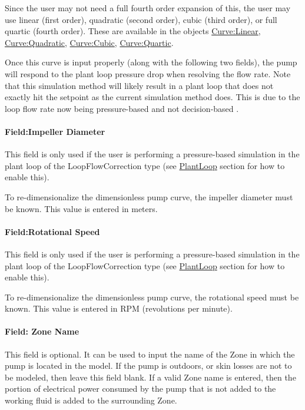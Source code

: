 Since the user may not need a full fourth order expansion of this, the user may use linear (first order), quadratic (second order), cubic (third order), or full quartic (fourth order). These are available in the objects \hyperref[curvelinear]{Curve:Linear}, \hyperref[curvequadratic]{Curve:Quadratic}, \hyperref[curvecubic]{Curve:Cubic}, \hyperref[curvequartic]{Curve:Quartic}.

Once this curve is input properly (along with the following two fields), the pump will respond to the plant loop pressure drop when resolving the flow rate. Note that this simulation method will likely result in a plant loop that does not exactly hit the setpoint as the current simulation method does. This is due to the loop flow rate now being pressure-based and not decision-based .

\paragraph{Field:Impeller Diameter}\label{fieldimpeller-diameter}

This field is only used if the user is performing a pressure-based simulation in the plant loop of the LoopFlowCorrection type (see \hyperref[plantloop]{PlantLoop} section for how to enable this).

To re-dimensionalize the dimensionless pump curve, the impeller diameter must be known. This value is entered in meters.

\paragraph{Field:Rotational Speed}\label{fieldrotational-speed}

This field is only used if the user is performing a pressure-based simulation in the plant loop of the LoopFlowCorrection type (see \hyperref[plantloop]{PlantLoop} section for how to enable this).

To re-dimensionalize the dimensionless pump curve, the rotational speed must be known. This value is entered in RPM (revolutions per minute).

\paragraph{Field: Zone Name}\label{field-zone-name-1-006}

This field is optional. It can be used to input the name of the Zone in which the pump is located in the model. If the pump is outdoors, or skin losses are not to be modeled, then leave this field blank. If a valid Zone name is entered, then the portion of electrical power consumed by the pump that is not added to the working fluid is added to the surrounding Zone.

